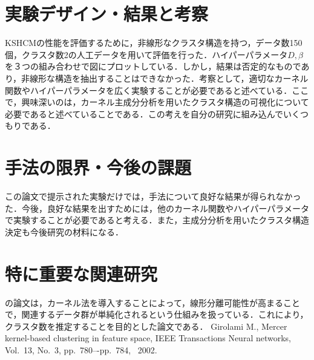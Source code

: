 \documentclass[10pt,onecolumn]{jsarticle}
\begin{document}
\section{実験デザイン・結果と考察}
KSHCMの性能を評価するために，非線形なクラスタ構造を持つ，データ数150個，クラスタ数2の人工データを用いて評価を行った．ハイパーパラメータ$D,\beta$を３つの組み合わせで図にプロットしている．しかし，結果は否定的なものであり，非線形な構造を抽出することはできなかった．考察として，適切なカーネル関数やハイパーパラメータを広く実験することが必要であると述べている．ここで，興味深いのは，カーネル主成分分析を用いたクラスタ構造の可視化について必要であると述べていることである．この考えを自分の研究に組み込んでいくつもりである．

\section{手法の限界・今後の課題}
この論文で提示された実験だけでは，手法について良好な結果が得られなかった．今後，良好な結果を出すためには，他のカーネル関数やハイパーパラメータで実験することが必要であると考える．また，主成分分析を用いたクラスタ構造決定も今後研究の材料になる．
\section{特に重要な関連研究}


\begin{thebibliography}{99}
%
\cite{ref1}の論文は，カーネル法を導入することによって，線形分離可能性が高まることで，関連するデータ群が単純化されるという仕組みを扱っている．これにより，クラスタ数を推定することを目的とした論文である．
	Girolami M., Mercer kernel-based clustering in feature space, IEEE Transactions Neural networks, Vol.~13, No.~3, pp.~780–-pp.~784, ~2002.
%
\end{thebibliography}



\end{document}
